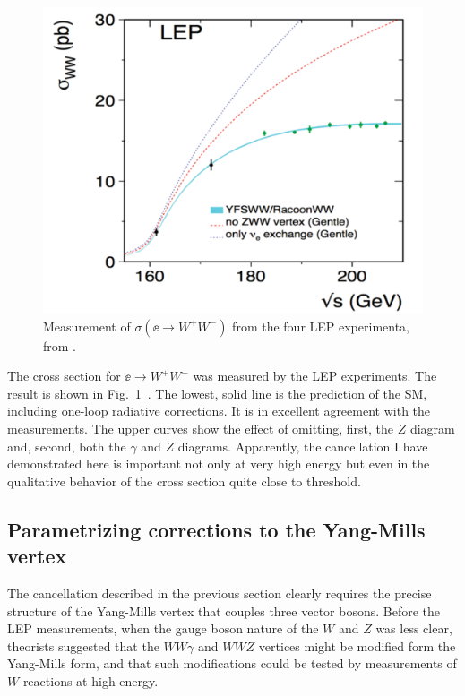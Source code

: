 \documentclass[12pt]{article}
\begin{document}
\begin{figure}
\begin{center}
\includegraphics[width=0.80\hsize]{eeWWdata.pdf}
\end{center}
\caption{Measurement of $\sigma(\ee\to W^+W^-)$ from the four LEP
  experimenta, from \cite{finalLEP}. }
\label{fig:eeWWdata}
\end{figure}



The cross section for $\ee\to W^+W^-$ was measured by the LEP
experiments.  The result is shown in
Fig.~\ref{fig:eeWWdata}~\cite{finalLEP}.   The lowest, solid line is
the prediction of the SM, including one-loop radiative corrections.
It is in excellent agreement with the measurements.   The upper curves
show the effect of omitting, first, the $Z$ diagram and, second, both
the $\gamma$ and $Z$ diagrams.  Apparently, the cancellation I have
demonstrated here is important not only at very high energy but even
in the qualitative behavior of the cross section quite close to threshold.


\subsection{Parametrizing corrections to the Yang-Mills vertex}

The cancellation described in the previous section clearly requires
the precise structure of the Yang-Mills vertex that couples three
vector bosons.  Before the LEP measurements, when the gauge boson nature of
the $W$ and $Z$ was less clear, theorists suggested that the
$WW\gamma$ and $WWZ$ vertices might be modified form the Yang-Mills
form, and that such modifications could be tested by measurements of
$W$ reactions at high energy.  
\end{document}
